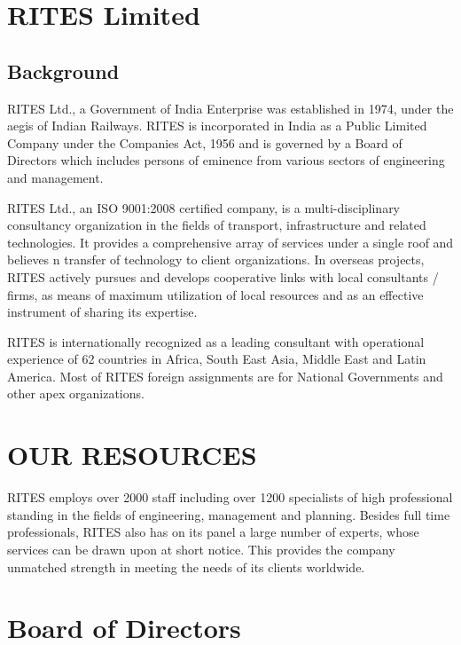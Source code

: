 \section{RITES Limited}

\subsection{Background}


RITES Ltd., a Government of India Enterprise was established in 1974, under the aegis of Indian Railways. RITES is incorporated in India as a Public Limited Company under the Companies Act, 1956 and is governed by a Board of Directors which includes persons of eminence from various sectors of engineering and management.

RITES Ltd., an ISO 9001:2008 certified company, is a multi-disciplinary consultancy organization in the fields of transport, infrastructure and related technologies. It provides a comprehensive array of services under a single roof and believes n transfer of technology to client organizations. In overseas projects, RITES actively pursues and develops cooperative links with local consultants / firms, as means of maximum utilization of local resources and as an effective instrument of sharing its expertise.

RITES is internationally recognized as a leading consultant with operational experience of 62 countries in Africa, South East Asia, Middle East and Latin America. Most of RITES foreign assignments are for National Governments and other apex organizations.

\section{OUR RESOURCES}

RITES employs over 2000 staff including over 1200 specialists of high professional standing in the fields of engineering, management and planning. Besides full time professionals, RITES also has on its panel a large number of experts, whose services can be drawn upon at short notice. 
This provides the company unmatched strength in meeting the needs of its clients worldwide.





\section{Board of Directors}
\noindent

